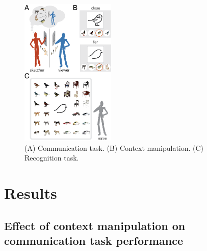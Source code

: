 \documentclass[9pt,twocolumn,twoside]{pnas-new}
\begin{document}
\begin{figure}[htbp]
\centering
\includegraphics[width=0.4\textwidth]{figures/1_task_display_alt.png}
\caption{(A) Communication task. (B) Context manipulation. (C) Recognition task.}
\label{task_display}
\end{figure}

\section*{Results}

\subsection*{Effect of context manipulation on communication task performance}


\end{document}
